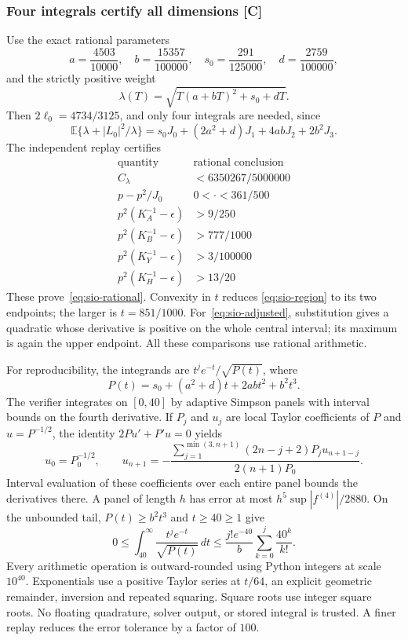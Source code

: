 \subsubsection{Four integrals certify all dimensions [C]}
Use the exact rational parameters
\[
 a=\frac{4503}{10000},\quad b=\frac{15357}{100000},\quad
 s_0=\frac{291}{125000},\quad d=\frac{2759}{100000},
\]
and the strictly positive weight
\[
 \lambda(T)=\sqrt{T(a+bT)^2+s_0+dT}.
\]
Then $2\ell_0=4734/3125$, and only four integrals are needed, since
\[
 \mathbb E\{\lambda+|L_0|^2/\lambda\}
 =s_0J_0+(2a^2+d)J_1+4abJ_2+2b^2J_3.
\]
The independent replay certifies
\[
 \begin{array}{c|c}
 \text{quantity}&\text{rational conclusion}\\\hline
 C_\lambda&<6350267/5000000\\
 p-p^2/J_0&0<\cdot<361/500\\
 p^2(K_A^{-1}-\epsilon)&>9/250\\
 p^2(K_B^{-1}-\epsilon)&>777/1000\\
 p^2(K_Y^{-1}-\epsilon)&>3/100000\\
 p^2(K_H^{-1}-\epsilon)&>13/20
 \end{array}
\]
These prove~\eqref{eq:sio-rational}. Convexity in $t$ reduces
\eqref{eq:sio-region} to its two endpoints; the larger is $t=851/1000$.
For~\eqref{eq:sio-adjusted}, substitution gives a quadratic whose derivative
is positive on the whole central interval; its maximum is again the
upper endpoint. All these comparisons use rational arithmetic.

For reproducibility, the integrands are
$t^j e^{-t}/\sqrt{P(t)}$, where
\[
 P(t)=s_0+(a^2+d)t+2abt^2+b^2t^3.
\]
The verifier integrates on $[0,40]$ by adaptive Simpson panels with
interval bounds on the fourth derivative. If $P_j$ and $u_j$ are local
Taylor coefficients of $P$ and $u=P^{-1/2}$, the identity
$2Pu'+P'u=0$ yields
\[
 u_0=P_0^{-1/2},\qquad
 u_{n+1}=-\frac{\sum_{j=1}^{\min(3,n+1)}(2n-j+2)P_j u_{n+1-j}}
                   {2(n+1)P_0}.
\]
Interval evaluation of these coefficients over each entire panel bounds
the derivatives there. A panel of length $h$ has error at most
$h^5\sup|f^{(4)}|/2880$. On the unbounded tail,
$P(t)\ge b^2t^3$ and $t\ge40\ge1$ give
\[
 0\le\int_{40}^\infty\frac{t^je^{-t}}{\sqrt{P(t)}}\,dt
 \le\frac{j!e^{-40}}b\sum_{k=0}^j\frac{40^k}{k!}.
\]
Every arithmetic operation is outward-rounded using Python integers at
scale $10^{40}$. Exponentials use a positive Taylor series at $t/64$,
an explicit geometric remainder, inversion and repeated squaring.
Square roots use integer square roots. No floating quadrature, solver
output, or stored integral is trusted. A finer replay reduces the error
tolerance by a factor of $100$.

